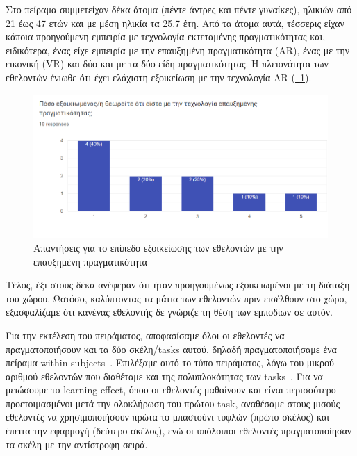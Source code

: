 Στο πείραμα συμμετείχαν δέκα άτομα (πέντε άντρες και πέντε γυναίκες), ηλικιών από 21 έως 47 ετών και με μέση ηλικία τα 25.7 έτη. Από τα άτομα αυτά, τέσσερις είχαν κάποια προηγούμενη εμπειρία με τεχνολογία εκτεταμένης πραγματικότητας και, ειδικότερα, ένας είχε εμπειρία με την επαυξημένη πραγματικότητα (AR), ένας με την εικονική (VR) και δύο και με τα δύο είδη πραγματικότητας. Η πλειονότητα των εθελοντών ένιωθε ότι έχει ελάχιστη εξοικείωση με την τεχνολογία AR (\hyperref[fig:questARFamiliariaty]{\schema~\ref*{fig:questARFamiliariaty}}).

\begin{figure}[!h]
    \centering
    \includegraphics[width=1\textwidth]{images/questionnaire_familiarityAR.png}
    \caption{Απαντήσεις για το επίπεδο εξοικείωσης των εθελοντών με την επαυξημένη πραγματικότητα}\label{fig:questARFamiliariaty}
\end{figure}

Τέλος, έξι στους δέκα ανέφεραν ότι ήταν προηγουμένως εξοικειωμένοι με τη διάταξη του χώρου. Ωστόσο, καλύπτοντας τα μάτια των εθελοντών πριν εισέλθουν στο χώρο, εξασφαλίζαμε ότι κανένας εθελοντής δε γνώριζε τη θέση των εμποδίων σε αυτόν.

Για την εκτέλεση του πειράματος, αποφασίσαμε όλοι οι εθελοντές να πραγματοποιήσουν και τα δύο σκέλη/tasks αυτού, δηλαδή πραγματοποιήσαμε ένα πείραμα within-subjects~\cite{bhandari_2021_withinsubjects}. Επιλέξαμε αυτό το τύπο πειράματος, λόγω του μικρού αριθμού εθελοντών που διαθέταμε και της πολυπλοκότητας των tasks~\cite{lazar_2017_research}. Για να μειώσουμε το learning effect, όπου οι εθελοντές μαθαίνουν και είναι περισσότερο προετοιμασμένοι μετά την ολοκλήρωση του πρώτου task, αναθέσαμε στους μισούς εθελοντές να χρησιμοποιήσουν πρώτα το μπαστούνι τυφλών (πρώτο σκέλος) και έπειτα την εφαρμογή (δεύτερο σκέλος), ενώ οι υπόλοιποι εθελοντές πραγματοποίησαν τα σκέλη με την αντίστροφη σειρά.

